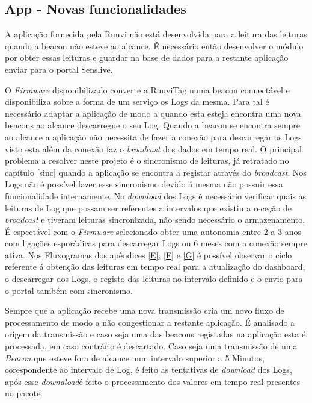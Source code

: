 \subsection{App - Novas funcionalidades}

\par A aplicação fornecida pela Ruuvi não está desenvolvida para a leitura das leituras quando a beacon não esteve ao alcance. É necessário então desenvolver o módulo por obter essas leituras e guardar na base de dados para a restante aplicação enviar para o portal Senslive.

\par O \textit{Firmware} disponibilizado converte a RuuviTag numa beacon connectável e disponibiliza sobre a forma de um serviço os Logs da mesma\cite{ruuvitlog}. Para tal é necessário adaptar a aplicação de modo a quando esta esteja encontra uma nova beacons ao alcance descarregue o seu Log. Quando a beacon se encontra sempre ao alcance a aplicação não necessita de fazer a conexão para descarregar os Logs visto esta além da conexão faz o \textit{broadcast} dos dados em tempo real. O principal problema a resolver neste projeto é o sincronismo de leituras, já retratado no capítulo \ref{sinc} quando a aplicação se encontra a registar através do \textit{broadcast}. Nos Logs não é possível fazer esse sincronismo devido á mesma não possuir essa funcionalidade internamente. No \textit{download} dos Logs é necessário verificar quais as leituras de Log que possam ser referentes a intervalos que existiu a receção de \textit{broadcast} e tiveram leituras sincronizada, não sendo necessário o armazenamento. É espectável com o \textit{Firmware} selecionado obter uma autonomia entre 2 a 3 anos com ligações esporádicas para descarregar Logs ou 6 meses com a conexão sempre ativa. Nos Fluxogramas dos apêndices  \ref{E}, \ref{F} e \ref{G} é possível observar o ciclo referente á obtenção das leituras em tempo real para a atualização do dashboard, o descarregar dos Logs, o registo das leituras no intervalo definido e o envio para o portal também com sincronismo.

\par Sempre que a aplicação recebe uma nova transmissão cria um novo fluxo de processamento de modo a não congestionar a restante aplicação. É analisado a origem da transmissão e caso seja uma das beacons registadas na aplicação esta é processada, em caso contrário é descartado. Caso seja uma transmissão de uma \textit{Beacon} que esteve fora de alcance num intervalo superior a 5 Minutos, corespondente ao intervalo de Log, é feito as tentativas de \textit{download} dos Logs, após esse \textit{downaload}é feito o processamento dos valores em tempo real presentes no pacote. 

